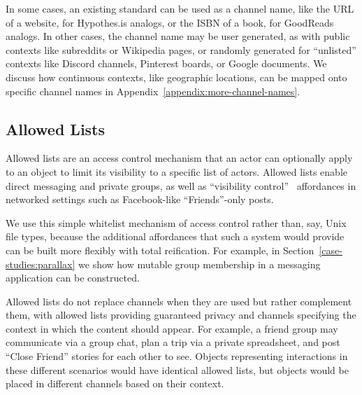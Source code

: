 In some cases, an existing standard can be used as a channel
name, like the URL of a website, for Hypothes.is analogs,
or the ISBN of a book, for GoodReads analogs.
In other cases, the channel name may be user generated,
as with public contexts like subreddits or Wikipedia pages,
or randomly generated for ``unlisted'' contexts like
Discord channels, Pinterest boards, or Google documents.
We discuss how continuous contexts, like geographic locations, can be
mapped onto specific channel names in Appendix~\ref{appendix:more-channel-names}.

\subsection{Allowed Lists}
\label{concepts:allowed-lists}

Allowed lists are an access control mechanism
that an actor can optionally apply to an object
to limit its visibility to a specific list of actors.
Allowed lists enable direct messaging and private groups,
as well as ``visibility control''~\cite{visibilitycontrol, toogayforfacebook}
affordances in networked settings such as
Facebook-like ``Friends''-only posts.

We use this simple whitelist mechanism of access control rather than,
say, Unix file types, because the additional affordances that
such a system would provide can be built more flexibly with total reification.
For example, in Section~{\ref{case-studies:parallax}} we show how mutable group
membership in a messaging application can be constructed.

Allowed lists do not replace channels when they are used
but rather complement them,
with allowed lists providing guaranteed privacy
and channels specifying the context in which the content should appear.
For example, a friend group may communicate via a group chat,
plan a trip via a private spreadsheet, and post ``Close Friend'' stories
for each other to see.
Objects representing interactions in these different scenarios
would have identical allowed lists,
but objects would be placed in different channels based on their context.
